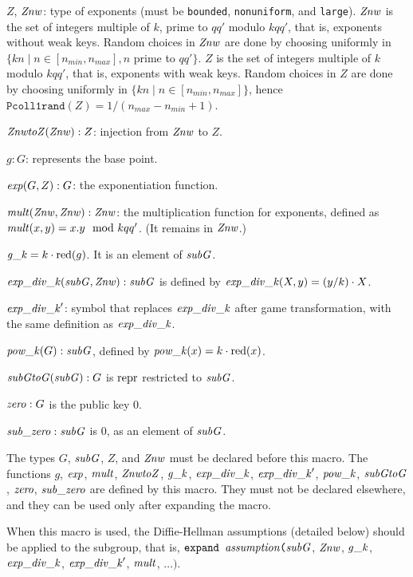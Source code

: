 \documentclass{article}
\begin{document}
\begin{itemize}
\begin{itemize}
\begin{itemize}
       $Z$, $\mathit{Znw}$: type of exponents (must be \texttt{bounded}, \texttt{nonuniform}, and \texttt{large}). 
   $\mathit{Znw}$ is the set of integers multiple of $k$, prime to $qq'$ modulo $kqq'$, that is, exponents without weak keys.
     Random choices in $\mathit{Znw}$ are done by choosing uniformly in 
     $\{ kn \mid n \in [n_{min},n_{max}], n$ prime to $qq' \}$.
       $Z$ is the set of integers multiple of $k$ modulo $kqq'$, that is, exponents with weak keys. Random choices in $Z$ are done by choosing uniformly in 
   $\{ kn \mid n \in [n_{min},n_{max}] \}$, hence $\texttt{Pcoll1rand}(Z) = 1/(n_{max}-n_{min}+1)$. 
       
       $\mathit{ZnwtoZ}(\mathit{Znw}):Z$: injection from $\mathit{Znw}$ to $Z$.

       $g: G$: represents the base point.

       $\mathit{exp}(G, Z): G$: the exponentiation function.  
       
       $\mathit{mult}(\mathit{Znw}, \mathit{Znw}): \mathit{Znw}$: the multiplication function for exponents, defined as
       $\mathit{mult}(x,y) = x.y \mod kqq'$. (It remains in $\mathit{Znw}$.)

       $\mathit{g\_k} = {k}\cdot{\mathrm{red}(g)}$. It is an element of $\mathit{subG}$.

       $\mathit{exp\_div\_k}(\mathit{subG},\mathit{Znw}): \mathit{subG}$ is defined by $\mathit{exp\_div\_k}(X,y) = {(y/k)}\cdot{X}$.

       $\mathit{exp\_div\_k}'$: symbol that replaces $\mathit{exp\_div\_k}$ after game transformation,
       with the same definition as $\mathit{exp\_div\_k}$.

       $\mathit{pow\_k}(G):\mathit{subG}$, defined by $\mathit{pow\_k}(x) = {k}\cdot{\mathrm{red}(x)}$.

       $\mathit{subGtoG}(\mathit{subG}):G$ is $\mathrm{repr}$ restricted to $\mathit{subG}$.

       $\mathit{zero}: G$ is the public key 0.
       
       $\mathit{sub\_zero}: \mathit{subG}$ is 0, as an element of $\mathit{subG}$.

       The types $G$, $\mathit{subG}$, $Z$, and $\mathit{Znw}$ must be declared before this macro.  The
       functions $g$, $\mathit{exp}$, $\mathit{mult}$, $\mathit{ZnwtoZ}$, $\mathit{g\_k}$, $\mathit{exp\_div\_k}$, $\mathit{exp\_div\_k}'$, $\mathit{pow\_k}$, $\mathit{subGtoG}$,
       $\mathit{zero}$, $\mathit{sub\_zero}$ are defined by this macro. They must not be declared
       elsewhere, and they can be used only after expanding the macro.

       When this macro is used, the Diffie-Hellman assumptions (detailed below)
       should be applied to the subgroup, that is,
       $\texttt{expand\ }\vn{assumption}\texttt{(}\vn{subG}$, $\mathit{Znw}$, $\mathit{g\_k}$, $\mathit{exp\_div\_k}$, $\mathit{exp\_div\_k}'$, $\mathit{mult}$, $\dots\texttt{).}$



\end{itemize}
\end{itemize}
\end{itemize}
\end{document}
